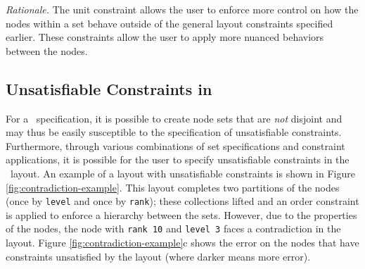 
\emph{Rationale.} The unit constraint allows the user to enforce more
control on how the nodes within a set behave outside of the general layout
constraints specified earlier. These constraints allow the user to apply
more nuanced behaviors between the nodes.

\subsection{Unsatisfiable Constraints in \projectname}

For a \projectname\ specification, it is possible to create node sets that
are \emph{not} disjoint and may thus be easily susceptible to the
specification of unsatisfiable constraints. Furthermore, through various
combinations of set specifications and constraint applications, it is
possible for the user to specify unsatisfiable constraints in the
\projectname\ layout. An example of a layout with unsatisfiable constraints
is shown in Figure \ref{fig:contradiction-example}. This layout completes
two partitions of the nodes (once by \texttt{level} and once by
\texttt{rank}); these collections lifted and an order constraint is applied
to enforce a hierarchy between the sets. However, due to the properties of
the nodes, the node with \texttt{rank 10} and \texttt{level 3} faces a
contradiction in the layout. Figure \ref{fig:contradiction-example}c shows
the error on the nodes that have constraints unsatisfied by the layout
(where darker means more error).


